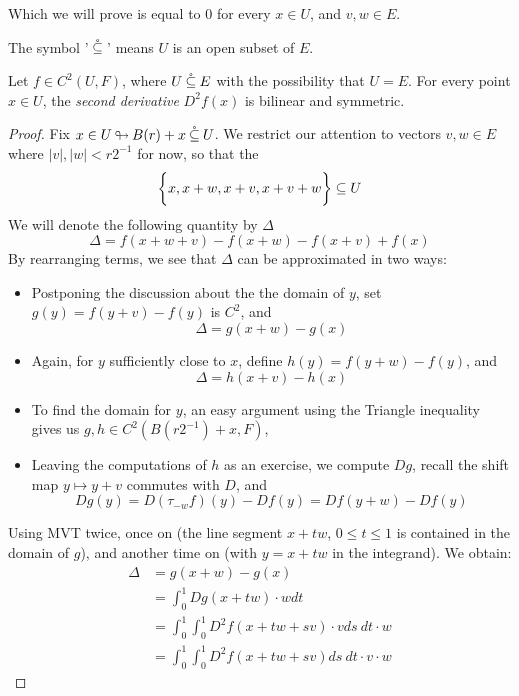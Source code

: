 \documentclass[../main-manifolds.tex]{subfiles}
\begin{document}
Which we will prove is equal to $0$ for every $x\in U$, and $v,w\in E$.

\begin{note}
The symbol '$\:\mathring{\subseteq}\:$' means $U$ is an open subset of $E$.    
\end{note}

\begin{wts}
    Let $f\in C^2(U, F)$, where $U\:\mathring{\subseteq}\: E$ with the possibility that $U = E$. For every point $x\in U$, the \emph{second derivative} $D^2f(x)$ is bilinear and symmetric.
\end{wts}
\begin{proof}
    Fix $x\in U{\:\looparrowright\:} B(r) + x\:\mathring{\subseteq}\: U$. We restrict our attention to vectors $v,w\in E$ where $\vert v\vert, \vert w\vert < r2^{-1}$ for now, so that the
    \[
    \biggl\{{x, x+w, x+v, x+v+w}\biggr\}\subseteq U
    \]
    We will denote the following quantity by $\Delta$
    \[
        \Delta = f(x+w+v) - f(x+w) - f(x+v) + f(x)
    \]
    By rearranging terms, we see that $\Delta$ can be approximated in two ways:
    \begin{itemize}
        \item Postponing the discussion about the the domain of $y$, set $g(y) = f(y+v) - f(y)$ is $C^2$, and 
        \begin{equation}\label{second-derivative-Delta-g}
            \Delta = g(x+w) - g(x)
        \end{equation}
        \item Again, for $y$ sufficiently close to $x$, define $h(y) = f(y+w) - f(y)$, and
        \begin{equation}\label{second-derivative-Delta-h}
            \Delta = h(x+v) - h(x)
        \end{equation}
        \item To find the domain for $y$, an easy argument using the Triangle inequality gives us $g,h \in C^2(B(r2^{-1}) + x, F)$,
        \item Leaving the computations of $h$ as an exercise, we compute $Dg$, recall the shift map $y\mapsto y+v$ commutes with $D$, and
        \begin{equation}\label{second-derivative-Delta-Dg}
            Dg(y) = D(\tau_{-w}f)(y)  - Df(y) = Df(y+w) - Df(y)
        \end{equation}
    \end{itemize}

    Using MVT twice, once on  (the line segment $x + tw$, $0\leq t\leq 1$ is contained in the domain of $g$), and another time on  (with $y = x+tw$ in the integrand). We obtain:
    \begin{align*}
        \Delta &= g(x+w) - g(x)\\
        &= \int_{0}^1 Dg(x+tw)\cdot w dt\\
        &= \int_0^1\int_0^1 D^2f(x + tw+sv)\cdot v ds\: dt \cdot w\\
        &= \int_0^1\int_0^1 D^2f(x + tw + sv) ds\: dt \cdot v\cdot w
    \end{align*}


\end{proof}
\end{document}
